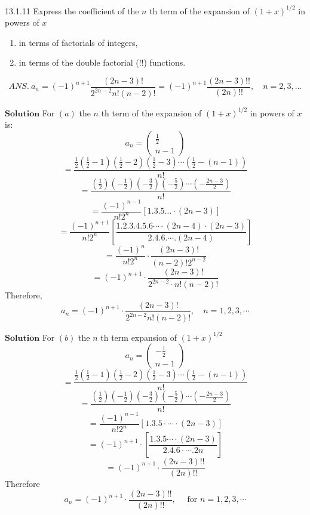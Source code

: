\documentclass{article}
\begin{document}
\begin{flushleft}
\newpage

\begin{mybox}{13.1.11}
Express the coefficient of the $n$ th term of the expansion of $(1+x)^{1 / 2}$ in powers of $x$
\begin{enumerate}[$(a)$]
\item in terms of factorials of integers,
\item in terms of the double factorial (!!) functions.
\end{enumerate} 
$$
A N S . \ a_{n}=(-1)^{n+1} \frac{(2 n-3) !}{2^{2 n-2} n !(n-2) !}=(-1)^{n+1} \frac{(2 n-3) ! !}{(2 n) ! !},\quad n=2,3, \ldots
$$
\end{mybox}

$\boxed{\textbf{Solution}}$ For $(a)$ the $n$ th term of the expansion of $(1+x)^{1 / 2}$ in powers of $x$ is:
$$a_{n}=\left(\begin{array}{c}\frac{1}{2} \\ n-1\end{array}\right)$$
$$=\frac{\frac{1}{2}\left(\frac{1}{2}-1\right)\left(\frac{1}{2}-2\right)\left(\frac{1}{2}-3\right) \cdots\left(\frac{1}{2}-(n-1)\right)}{n !}$$
$$=\frac{\left(\frac{1}{2}\right)\left(-\frac{1}{2}\right)\left(-\frac{3}{2}\right)\left(-\frac{5}{2}\right) \cdots\left(-\frac{2 n-3}{2}\right)}{n !}$$
$$=\frac{(-1)^{n-1}}{n ! 2^{n}}[1.3 .5 \ldots \cdot(2 n-3)]$$
$$=\frac{(-1)^{n+1}}{n ! 2^{n}}\left[\frac{1.2 .3 .4 .5 .6 \cdots \cdot(2 n-4) \cdot(2 n-3)}{2.4 .6 . \cdots .(2 n-4)}\right]$$
$$=\frac{(-1)^{n}}{n ! 2^{n}} \cdot \frac{(2 n-3) !}{(n-2) ! 2^{n-2}}$$
$$=(-1)^{n+1} \cdot \frac{(2 n-3) !}{2^{2 n-2} \cdot n !(n-2) !}$$
Therefore, 
$$
a_{n}=(-1)^{n+1} \cdot \frac{(2 n-3) !}{2^{2 n-2} n !(n-2) !}, \quad  n=1,2,3, \cdots
$$

$\boxed{\textbf{Solution}}$ For $(b)$ the $n$ th term expansion of $(1+x)^{1 / 2}$ 
$$a_{n}=\left(\begin{array}{c}-\frac{1}{2} \\ n-1\end{array}\right)$$
$$=\frac{\frac{1}{2}\left(\frac{1}{2}-1\right)\left(\frac{1}{2}-2\right)\left(\frac{1}{2}-3\right) \cdots\left(\frac{1}{2}-(n-1)\right)}{n !}$$
$$=\frac{\left(\frac{1}{2}\right)\left(-\frac{1}{2}\right)\left(-\frac{3}{2}\right)\left(-\frac{5}{2}\right) \cdots\left(-\frac{2 n-3}{2}\right)}{n !}$$
$$=\frac{(-1)^{n-1}}{n ! 2^{n}}[1.3 .5 \cdot \cdots \cdot(2 n-3)]$$
$$=(-1)^{n+1} \cdot\left[\frac{1.3 .5 \cdots \cdot(2 n-3)}{2.4 .6 \cdot \cdots .2 n}\right]$$
$$=(-1)^{n+1} \cdot \frac{(2 n-3) ! !}{(2 n) ! !}$$
Therefore
$$
a_{n}=(-1)^{n+1} \cdot \frac{(2 n-3) ! !}{(2 n) ! !}, \quad \text { for } n=1,2,3, \cdots
$$


\end{flushleft}
\end{document}
